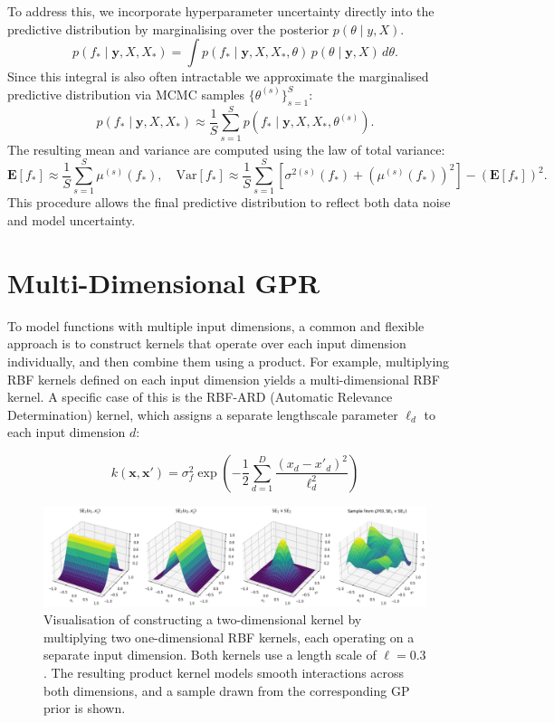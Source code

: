 \documentclass[12pt]{article}
\begin{document}
To address this, we incorporate hyperparameter uncertainty directly into the predictive distribution by marginalising over the posterior \( p(\theta \mid y, X) \).
%
\begin{equation}
p(f_* \mid \mathbf{y}, X, X_*) = \int p(f_* \mid \mathbf{y}, X, X_*, \theta) \, p(\theta \mid \mathbf{y}, X) \, d\theta.
\end{equation}
Since this integral is also often intractable we approximate the marginalised predictive distribution via MCMC samples \( \{\theta^{(s)}\}_{s=1}^S \):
%
\begin{equation}
p(f_* \mid \mathbf{y}, X, X_*) \approx \frac{1}{S} \sum_{s=1}^{S} p(f_* \mid \mathbf{y}, X, X_*, \theta^{(s)}).
\end{equation}
%
The resulting mean and variance are computed using the law of total variance:
%
\begin{equation}
\mathbf{E}[f_*] \approx \frac{1}{S} \sum_{s=1}^{S} \mu^{(s)}(f_*), \quad
\text{Var}[f_*] \approx \frac{1}{S} \sum_{s=1}^{S} \left[ \sigma^{2(s)}(f_*) + \left(\mu^{(s)}(f_*)\right)^2 \right] - \left( \mathbf{E}[f_*] \right)^2.
\end{equation}
This procedure allows the final predictive distribution to reflect both data noise and model uncertainty.


\section{Multi-Dimensional GPR}

To model functions with multiple input dimensions, a common and flexible approach is to construct kernels that operate over each input dimension individually, 
and then combine them using a product. For example, multiplying RBF kernels defined on each input dimension yields a multi-dimensional RBF kernel.
A specific case of this is the RBF-ARD (Automatic Relevance Determination) kernel, which assigns a separate lengthscale parameter \( \ell_d \) to each input dimension \( d \):

\[
k(\mathbf{x}, \mathbf{x}') = \sigma_f^2 \exp\left( -\frac{1}{2} \sum_{d=1}^D \frac{(x_d - x'_d)^2}{\ell_d^2} \right)
\]

\begin{figure}[H]
    \centering
    \includegraphics[width=\textwidth]{LatexPlots/final_gps_plots/2dkernels.png}
    \caption{
    Visualisation of constructing a two-dimensional kernel by multiplying two one-dimensional RBF kernels, each operating on a separate input dimension. Both kernels use a length scale of \(\ell = 0.3\). 
    The resulting product kernel models smooth interactions across both dimensions, and a sample drawn from the corresponding GP prior is shown.}
    \label{fig:2dkernels}
\end{figure}
\end{document}
